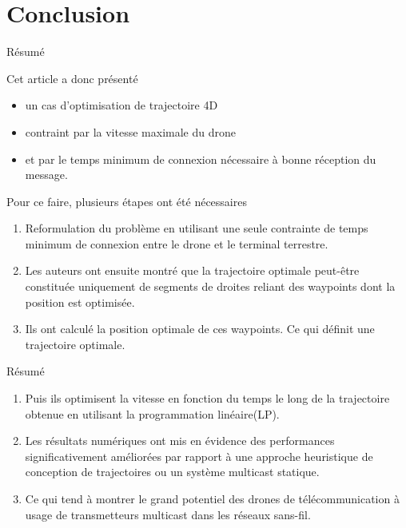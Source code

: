 \section{Conclusion}


\begin{frame} {Résumé}

Cet article a donc présenté 
\begin{itemize}
	\item un cas d'optimisation de trajectoire 4D
	\item contraint par la vitesse maximale du drone
	\item et par le temps minimum de connexion nécessaire à bonne réception du message. 
\end{itemize}


\end{frame}



\begin{frame} {}

Pour ce faire, plusieurs étapes ont été nécessaires

\begin{enumerate}
	\item Reformulation du problème en utilisant une seule contrainte
	de temps minimum de connexion entre le drone et le terminal terrestre.\pause
	
	\item Les auteurs ont ensuite montré que la trajectoire optimale
	peut-être constituée uniquement de segments de droites reliant des
	waypoints dont la position est optimisée.\pause
	\item Ils ont calculé la position optimale de ces waypoints.
	Ce qui définit une trajectoire optimale. \pause 
	\asuivre
	
\end{enumerate}
\end{frame}	
	
\begin{frame} {Résumé}



\begin{enumerate}	
	
	 \suite
	\item Puis ils optimisent la vitesse en fonction du temps le long de la trajectoire obtenue
	en utilisant la programmation linéaire(LP).\pause
	\item Les résultats numériques ont mis en évidence des performances significativement améliorées
	 par rapport à une approche heuristique de conception de trajectoires ou un système multicast statique.\pause
	\item Ce qui tend à montrer le grand potentiel des drones de 
	télécommunication à usage de transmetteurs multicast dans les réseaux sans-fil.
	 
\end{enumerate}
\end{frame}



